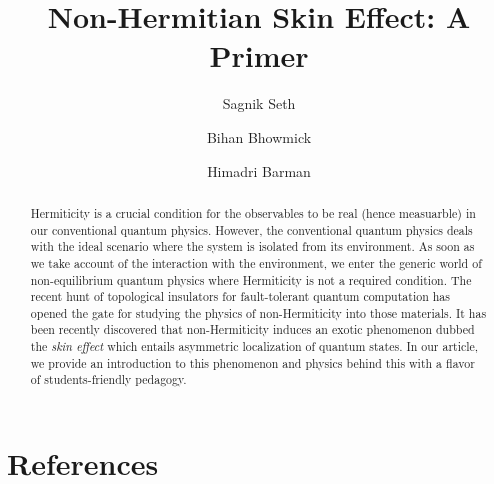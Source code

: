 \documentclass[aps,prb,epsf,epsfig,floatfix,showpacs,groupedaddres,superscriptaddress]{revtex4-1}
\numberwithin{equation}{section}
\def\bi{\begin{itemize}}
\def\ei{\end{itemize}}
\def\i{\item}
\def\alert#1{\textcolor{red}{#1}}  %
\begin{document}
\title{Non-Hermitian Skin Effect: A Primer}
\author{Sagnik Seth}
%
\author{Bihan Bhowmick}
%
%
\author{Himadri Barman}
%
\begin{abstract}
Hermiticity is a crucial condition for the observables to be real (hence measuarble) 
in our conventional quantum physics.
However, the conventional quantum physics deals with the ideal scenario where the system
is isolated from its environment. As soon as we take account of the interaction with the 
environment, we enter the generic world of non-equilibrium quantum physics where Hermiticity
is not a required condition. The recent hunt of topological insulators for fault-tolerant 
quantum computation has opened the gate for studying the physics of non-Hermiticity into
those materials. It has been recently discovered that non-Hermiticity induces an exotic
phenomenon dubbed the \emph{skin effect} which entails asymmetric localization of 
quantum states. In our article, we provide an introduction to this phenomenon and physics
behind this with a flavor of students-friendly pedagogy.    
\end{abstract}
\maketitle

\def\hHN{{\hat H}_{\rm{HN}} }
\def\hSSH{{\hat H}_{\rm{SSH}} }
\def\hNHSSH{{\hat H}_{\rm{NHSSH}} }
\tableofcontents












% 
% 












\section*{References}
%
%

\end{document}
